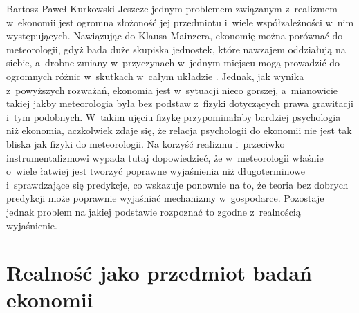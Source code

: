 \begin{artplenv}{Bartosz Paweł Kurkowski}
Jeszcze jednym problemem związanym z~realizmem w~ekonomii jest ogromna złożoność jej przedmiotu i~wiele współzależności
w~nim występujących. Nawiązując do Klausa Mainzera, ekonomię można porównać do meteorologii, gdyż bada duże skupiska
jednostek, które nawzajem oddziałują na siebie, a~drobne zmiany w~przyczynach w~jednym miejscu mogą prowadzić do
ogromnych różnic w~skutkach w~całym układzie
\parencite[s.~278–280]{gorazda_filozofia_2014}.
Jednak, jak
wynika z~powyższych rozważań, ekonomia jest w~sytuacji nieco gorszej, a~mianowicie takiej jakby meteorologia była bez
podstaw z~fizyki dotyczących prawa grawitacji i~tym podobnych. W~takim ujęciu fizykę przypominałaby bardziej psychologia niż
ekonomia, aczkolwiek zdaje się, że relacja psychologii do ekonomii nie jest tak bliska jak fizyki do meteorologii. Na
korzyść realizmu i~przeciwko instrumentalizmowi wypada tutaj dopowiedzieć, że w~meteorologii właśnie o~wiele łatwiej
jest tworzyć poprawne wyjaśnienia niż długoterminowe i~sprawdzające się predykcje, co wskazuje ponownie na to, że
teoria bez dobrych predykcji może poprawnie wyjaśniać mechanizmy w~gospodarce. Pozostaje jednak problem na jakiej
podstawie rozpoznać to zgodne z~realnością wyjaśnienie.

\section{Realność jako przedmiot badań ekonomii}


\end{artplenv}
